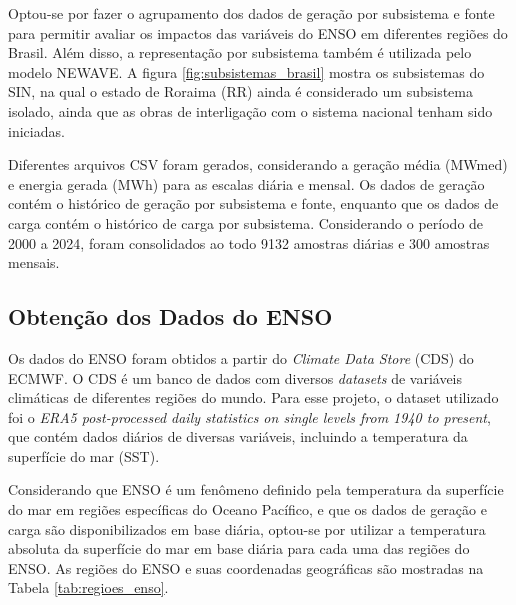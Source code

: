 \begin{figure}[!ht]
	{}
	{}
\end{figure}

Optou-se por fazer o agrupamento dos dados de geração por subsistema e fonte para permitir avaliar os impactos das variáveis
do ENSO em diferentes regiões do Brasil. Além disso, a representação por subsistema também é utilizada pelo modelo NEWAVE. 
A figura \ref{fig:subsistemas_brasil} mostra os subsistemas do SIN, na qual o estado de Roraima (RR) ainda é considerado
um subsistema isolado, ainda que as obras de interligação com o sistema nacional tenham sido iniciadas.

Diferentes arquivos CSV foram gerados, considerando a geração média (MWmed) e energia gerada (MWh) para as escalas diária e mensal.
Os dados de geração contém o histórico de geração por subsistema e fonte, enquanto que os dados de carga contém o histórico de carga
por subsistema. Considerando o período de 2000 a 2024, foram consolidados ao todo 9132 amostras diárias e 300 amostras mensais.

\subsection{Obtenção dos Dados do ENSO} %
Os dados do ENSO foram obtidos a partir do \textit{Climate Data Store} (CDS) do ECMWF. O CDS é um banco de dados com diversos
\textit{datasets} de variáveis climáticas de diferentes regiões do mundo. Para esse projeto, o dataset utilizado foi o 
\textit{ERA5 post-processed daily statistics on single levels from 1940 to present}, que contém dados diários de diversas 
variáveis, incluindo a temperatura da superfície do mar (SST).

Considerando que ENSO é um fenômeno definido pela temperatura da superfície do mar em regiões 
específicas do Oceano Pacífico, e que os dados de geração e carga são disponibilizados em base diária,
optou-se por utilizar a temperatura absoluta da superfície do mar em base diária para cada uma das regiões do ENSO. As
regiões do ENSO e suas coordenadas geográficas são mostradas na Tabela \ref{tab:regioes_enso}.

\begin{table}[htb]
  \centering
\end{table}

